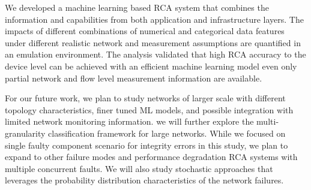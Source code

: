 We developed a machine learning based RCA system that combines the information and capabilities from both application and infrastructure layers. 
The impacts of different combinations of numerical and categorical data features under different realistic network and measurement assumptions are quantified in an emulation environment. 
The analysis validated that high RCA accuracy to the device level can be achieved with an efficient machine learning model even only partial network and flow level measurement information are available.

For our future work, we plan to study networks of larger scale with different topology characteristics, finer tuned ML models, and possible integration with limited network monitoring information. we will further explore the multi-granularity classification framework for large networks. While we focused on single faulty component scenario for integrity errors in this study, we plan to expand to other failure modes and performance degradation RCA systems with multiple concurrent faults. We will also study stochastic approaches that leverages the probability distribution characteristics of the network failures.  
